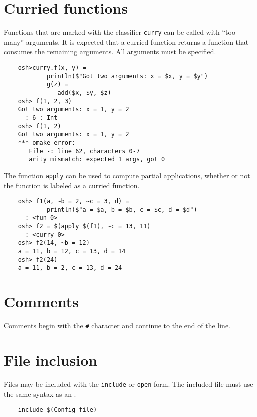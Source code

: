 \section{Curried functions}

\newinkeyword

Functions that are marked with the classifier \verb+curry+ can be called with ``too many'' arguments.
It is expected that a curried function returns a function that consumes the remaining arguments.
All arguments must be specified.

\begin{verbatim}
    osh>curry.f(x, y) =
            println($"Got two arguments: x = $x, y = $y")
            g(z) =
               add($x, $y, $z)
    osh> f(1, 2, 3)
    Got two arguments: x = 1, y = 2
    - : 6 : Int
    osh> f(1, 2)
    Got two arguments: x = 1, y = 2
    *** omake error:
       File -: line 62, characters 0-7
       arity mismatch: expected 1 args, got 0
\end{verbatim}

The function \verb+apply+ can be used to compute partial applications, whether or not the function
is labeled as a curried function.

\begin{verbatim}
    osh> f1(a, ~b = 2, ~c = 3, d) =
            println($"a = $a, b = $b, c = $c, d = $d")
    - : <fun 0>
    osh> f2 = $(apply $(f1), ~c = 13, 11)
    - : <curry 0>
    osh> f2(14, ~b = 12)
    a = 11, b = 12, c = 13, d = 14
    osh> f2(24)
    a = 11, b = 2, c = 13, d = 24
\end{verbatim}

\section{Comments}

Comments begin with the \verb+#+ character and continue to the end of the line.

\section{File inclusion}
\label{section:include}

Files may be included with the \verb+include+ or \verb+open+ form.  The included file must use
the same syntax as an .

\begin{verbatim}
    include $(Config_file)
\end{verbatim}

